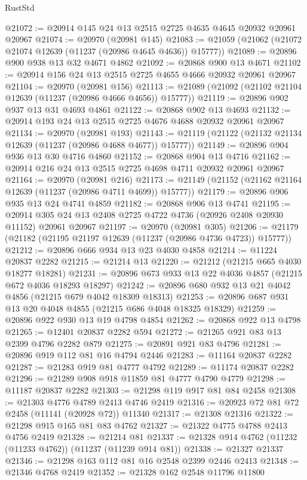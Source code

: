 \begin{lexlean}{RustStd}
\begin{coremodule}
@21072 := @20914 @145 @24 @13 @2515 @2725 @4635 @4645 @20932 @20961 @20967
@21074 := @20970 (@20981 @145)
@21083 := @21059 (@21062 (@21072 @21074 @12639 (@11237 (@20986 @4645 @4636)) @15777))
@21089 := @20896 @900 @938 @13 @32 @4671 @4862
@21092 := @20868 @900 @13 @4671
@21102 := @20914 @156 @24 @13 @2515 @2725 @4655 @4666 @20932 @20961 @20967
@21104 := @20970 (@20981 @156)
@21113 := @21089 (@21092 (@21102 @21104 @12639 (@11237 (@20986 @4666 @4656)) @15777))
@21119 := @20896 @902 @937 @13 @31 @4693 @4861
@21122 := @20868 @902 @13 @4693
@21132 := @20914 @193 @24 @13 @2515 @2725 @4676 @4688 @20932 @20961 @20967
@21134 := @20970 (@20981 @193)
@21143 := @21119 (@21122 (@21132 @21134 @12639 (@11237 (@20986 @4688 @4677)) @15777))
@21149 := @20896 @904 @936 @13 @30 @4716 @4860
@21152 := @20868 @904 @13 @4716
@21162 := @20914 @216 @24 @13 @2515 @2725 @4698 @4711 @20932 @20961 @20967
@21164 := @20970 (@20981 @216)
@21173 := @21149 (@21152 (@21162 @21164 @12639 (@11237 (@20986 @4711 @4699)) @15777))
@21179 := @20896 @906 @935 @13 @24 @4741 @4859
@21182 := @20868 @906 @13 @4741
@21195 := @20914 @305 @24 @13 @2408 @2725 @4722 @4736 (@20926 @2408 @20930 @11152) @20961 @20967
@21197 := @20970 (@20981 @305)
@21206 := @21179 (@21182 (@21195 @21197 @12639 (@11237 (@20986 @4736 @4723)) @15777))
@21212 := @20896 @666 @934 @13 @23 @4030 @4858
@21214 := @11224 @20837 @2282
@21215 := @21214 @13
@21220 := @21212 (@21215 @665 @4030 @18277 @18281)
@21231 := @20896 @673 @933 @13 @22 @4036 @4857 (@21215 @672 @4036 @18293 @18297)
@21242 := @20896 @680 @932 @13 @21 @4042 @4856 (@21215 @679 @4042 @18309 @18313)
@21253 := @20896 @687 @931 @13 @20 @4048 @4855 (@21215 @686 @4048 @18325 @18329)
@21259 := @20896 @922 @930 @13 @19 @4798 @4854
@21262 := @20868 @922 @13 @4798
@21265 := @12401 @20837 @2282 @594
@21272 := @21265 @921 @83 @13 @2399 @4796 @2282 @879
@21275 := @20891 @921 @83 @4796
@21281 := @20896 @919 @112 @81 @16 @4794 @2446
@21283 := @11164 @20837 @2282
@21287 := @21283 @919 @81 @4777 @4792
@21289 := @11174 @20837 @2282
@21296 := @21289 @908 @918 @11859 @81 @4777 @4790 @4779
@21298 := @11187 @20837 @2282
@21303 := @21298 @119 @917 @81 @84 @2458
@21308 := @21303 @4776 @4789 @2413 @4746 @2419
@21316 := @20923 @72 @81 @72 @2458 (@11141 (@20928 @72)) @11340
@21317 := @21308 @21316
@21322 := @21298 @915 @165 @81 @83 @4762
@21327 := @21322 @4775 @4788 @2413 @4756 @2419
@21328 := @21214 @81
@21337 := @21328 @914 @4762 (@11232 (@11233 @4762)) (@11237 (@11239 @914 @81))
@21338 := @21327 @21337
@21346 := @21298 @163 @112 @81 @16 @2548 @2399 @2446 @2413
@21348 := @21346 @4768 @2419
@21352 := @21328 @162 @2548 @11796 @11800

\end{coremodule}
\end{lexlean}
